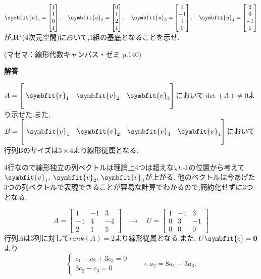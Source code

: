 $
    \symbfit{u}_1 = \begin{bmatrix}1\\1\\0\\1 \end{bmatrix}, \quad 
    \symbfit{u}_2 = \begin{bmatrix}0\\1\\2\\1 \end{bmatrix}, \quad 
    \symbfit{u}_3 = \begin{bmatrix}1\\-1\\1\\0 \end{bmatrix}, \quad
    \symbfit{u}_4 = \begin{bmatrix}2\\0\\-1\\1 \end{bmatrix}
$が,$\mathbf{R}^4$(4次元空間)において,1組の基底となることを示せ.
\begin{flushright}
    (マセマ：線形代数キャンパス・ゼミ p.140)
\end{flushright}

\noindent
\textbf{解答}\\

$A=\begin{bmatrix}
    && \\
    \;\symbfit{v}_1 & \symbfit{v}_2 & \symbfit{v}_3 \\
    && 
\end{bmatrix}$において$\det(A)\neq 0$より示せた.また,$B=\begin{bmatrix}
    &&& \\
    \;\symbfit{v}_1 & \symbfit{v}_2 & \symbfit{v}_3 & \symbfit{v}_4 \\
    &&& 
\end{bmatrix}$において行列Bのサイズは$3\times 4$より線形従属となる.\\

4行なので線形独立の列ベクトルは理論上4つは超えない.-1の位置から考えて$\symbfit{v}_1,\;\symbfit{v}_2,\,\symbfit{v}_3$が上がる.
他のベクトルは今あげた3つの列ベクトルで表現できることが容易な計算でわかるので,簡約化せずに3つとなる.\\

\[
A=\begin{bmatrix}1 & -1 & 3 \\ -1 & 4 & -4 \\2 & 1 & 5\end{bmatrix}
\quad \rightarrow \quad
U=\begin{bmatrix}1 & -1 & 3 \\ 0 & 3 & -1 \\ 0 & 0 & 0\end{bmatrix}\]
行列$A$は3列に対して$rank(A)=2$より線形従属となる.また,
$U\symbfit{c}=\mathbf{0}$より
\[
\begin{cases*}
    c_1 -c_2+3c_3 = 0 \\
    3c_2-c_3=0
\end{cases*} \qquad \therefore \;a_2=8a_1-3a_3.\]

